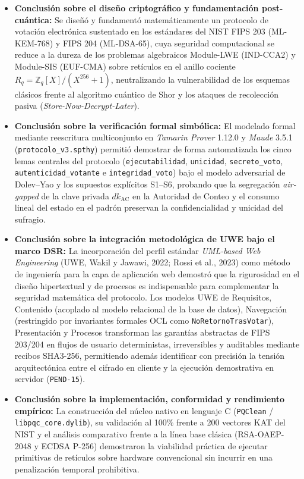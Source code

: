 \begin{itemize}
	\item \textbf{Conclusión sobre el diseño criptográfico y fundamentación post-cuántica:} Se diseñó y fundamentó matemáticamente un protocolo de votación electrónica sustentado en los estándares del NIST FIPS 203 (ML-KEM-768) y FIPS 204 (ML-DSA-65), cuya seguridad computacional se reduce a la dureza de los problemas algebraicos Module-LWE (IND-CCA2) y Module-SIS (EUF-CMA) sobre retículos en el anillo cociente $R_q = \mathbb{Z}_q[X]/(X^{256}+1)$, neutralizando la vulnerabilidad de los esquemas clásicos frente al algoritmo cuántico de Shor y los ataques de recolección pasiva (\textit{Store-Now-Decrypt-Later}).
	\item \textbf{Conclusión sobre la verificación formal simbólica:} El modelado formal mediante reescritura multiconjunto en \textit{Tamarin Prover} 1.12.0 y \textit{Maude} 3.5.1 (\texttt{protocolo\_v3.spthy}) permitió demostrar de forma automatizada los cinco lemas centrales del protocolo (\texttt{ejecutabilidad}, \texttt{unicidad}, \texttt{secreto\_voto}, \texttt{autenticidad\_votante} e \texttt{integridad\_voto}) bajo el modelo adversarial de Dolev--Yao y los supuestos explícitos S1--S6, probando que la segregación \textit{air-gapped} de la clave privada $dk_{\text{AC}}$ en la Autoridad de Conteo y el consumo lineal del estado en el padrón preservan la confidencialidad y unicidad del sufragio.
	\item \textbf{Conclusión sobre la integración metodológica de UWE bajo el marco DSR:} La incorporación del perfil estándar \textit{UML-based Web Engineering} (UWE, Wakil y Jawawi, 2022; Rossi et al., 2023) como método de ingeniería para la capa de aplicación web demostró que la rigurosidad en el diseño hipertextual y de procesos es indispensable para complementar la seguridad matemática del protocolo. Los modelos UWE de Requisitos, Contenido (acoplado al modelo relacional de la base de datos), Navegación (restringido por invariantes formales OCL como \texttt{NoRetornoTrasVotar}), Presentación y Procesos transforman las garantías abstractas de FIPS 203/204 en flujos de usuario deterministas, irreversibles y auditables mediante recibos SHA3-256, permitiendo además identificar con precisión la tensión arquitectónica entre el cifrado en cliente y la ejecución demostrativa en servidor (\texttt{PEND-15}).
	\item \textbf{Conclusión sobre la implementación, conformidad y rendimiento empírico:} La construcción del núcleo nativo en lenguaje C (\texttt{PQClean} / \texttt{libpqc\_core.dylib}), su validación al 100\% frente a 200 vectores KAT del NIST y el análisis comparativo frente a la línea base clásica (RSA-OAEP-2048 y ECDSA P-256) demostraron la viabilidad práctica de ejecutar primitivas de retículos sobre hardware convencional sin incurrir en una penalización temporal prohibitiva.
\end{itemize}

